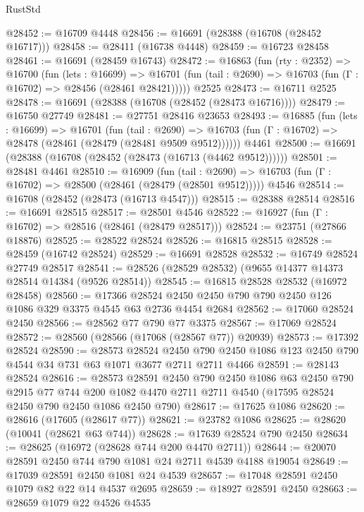 \begin{lexlean}{RustStd}
\begin{coremodule}
@28452 := @16709 @4448
@28456 := @16691 (@28388 (@16708 (@28452 @16717)))
@28458 := @28411 (@16738 @4448)
@28459 := @16723 @28458
@28461 := @16691 (@28459 @16743)
@28472 := @16863
    (fun (rty : @2352) =>
    @16700
      (fun (lets : @16699) =>
      @16701 (fun (tail : @2690) => @16703 (fun (Γ : @16702) => @28456 (@28461 @28421)))))
    @2525
@28473 := @16711 @2525
@28478 := @16691 (@28388 (@16708 (@28452 (@28473 @16716))))
@28479 := @16750 @27749
@28481 := @27751 @28416 @23653
@28493 := @16885
    (fun (lets : @16699) =>
    @16701
      (fun (tail : @2690) =>
      @16703 (fun (Γ : @16702) => @28478 (@28461 (@28479 (@28481 @9509 @9512))))))
    @4461
@28500 := @16691 (@28388 (@16708 (@28452 (@28473 (@16713 (@4462 @9512))))))
@28501 := @28481 @4461
@28510 := @16909
    (fun (tail : @2690) => @16703 (fun (Γ : @16702) => @28500 (@28461 (@28479 (@28501 @9512)))))
    @4546
@28514 := @16708 (@28452 (@28473 (@16713 @4547)))
@28515 := @28388 @28514
@28516 := @16691 @28515
@28517 := @28501 @4546
@28522 := @16927 (fun (Γ : @16702) => @28516 (@28461 (@28479 @28517)))
@28524 := @23751 (@27866 @18876)
@28525 := @28522 @28524
@28526 := @16815 @28515
@28528 := @28459 (@16742 @28524)
@28529 := @16691 @28528
@28532 := @16749 @28524 @27749 @28517
@28541 := @28526 (@28529 @28532) (@9655 @14377 @14373 @28514 @14384 (@9526 @28514))
@28545 := @16815 @28528 @28532 (@16972 @28458)
@28560 := @17366
    @28524
    @2450
    @2450
    @790
    @790
    @2450
    @126
    @1086
    @329
    @3375
    @4545
    @63
    @2736
    @4454
    @2684
@28562 := @17060 @28524 @2450
@28566 := @28562 @77 @790 @77 @3375
@28567 := @17069 @28524
@28572 := @28560 (@28566 (@17068 (@28567 @77)) @20939)
@28573 := @17392 @28524
@28590 := @28573
    @28524
    @2450
    @790
    @2450
    @1086
    @123
    @2450
    @790
    @4544
    @34
    @731
    @63
    @1071
    @3677
    @2711
    @2711
    @4466
@28591 := @28143 @28524
@28616 := @28573
    @28591
    @2450
    @790
    @2450
    @1086
    @63
    @2450
    @790
    @2915
    @77
    @744
    @200
    @1082
    @4470
    @2711
    @2711
    @4540
    (@17595 @28524 @2450 @790 @2450 @1086 @2450 @790)
@28617 := @17625 @1086
@28620 := @28616 (@17605 (@28617 @77))
@28621 := @23782 @1086
@28625 := @28620 (@10041 (@28621 @63 @744))
@28628 := @17639 @28524 @790 @2450
@28634 := @28625 (@16972 (@28628 @744 @200 @4470 @2711))
@28644 := @20070 @28591 @2450 @744 @790 @1081 @24 @2711 @4539 @4188 @19054
@28649 := @17039 @28591 @2450 @1081 @24 @4539
@28657 := @17048 @28591 @2450 @1079 @82 @22 @14 @4537 @2695
@28659 := @18927 @28591 @2450
@28663 := @28659 @1079 @22 @4526 @4535

\end{coremodule}
\end{lexlean}
